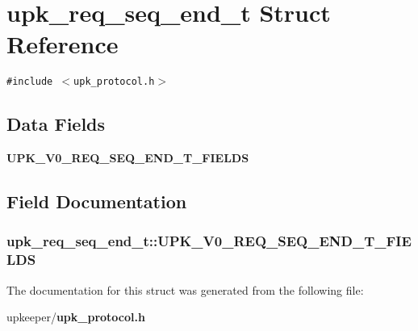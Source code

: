 \section{upk\_\-req\_\-seq\_\-end\_\-t Struct Reference}
\label{structupk__req__seq__end__t}
{\tt \#include $<$upk\_\-protocol.h$>$}

\subsection*{Data Fields}
\begin{CompactItemize}
\item 
\bf{UPK\_\-V0\_\-REQ\_\-SEQ\_\-END\_\-T\_\-FIELDS}
\end{CompactItemize}


\subsection{Field Documentation}
\subsubsection{\setlength{\rightskip}{0pt plus 5cm}\bf{upk\_\-req\_\-seq\_\-end\_\-t::UPK\_\-V0\_\-REQ\_\-SEQ\_\-END\_\-T\_\-FIELDS}}\label{structupk__req__seq__end__t_81bfcda0b3658c75da52c88e122d5748}




The documentation for this struct was generated from the following file:\begin{CompactItemize}
\item 
upkeeper/\bf{upk\_\-protocol.h}\end{CompactItemize}
